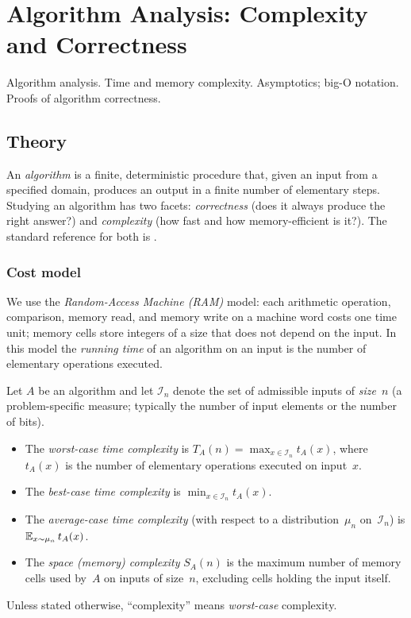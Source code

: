 
\section{Algorithm Analysis: Complexity and Correctness}
\label{sec:1.3.01-complexity-correctness}

\begin{ticket}
Algorithm analysis. Time and memory complexity. Asymptotics; big-O notation. Proofs of algorithm correctness.
\end{ticket}

\subsection*{Theory}

An \emph{algorithm} is a finite, deterministic procedure that, given an
input from a specified domain, produces an output in a finite number of
elementary steps. Studying an algorithm has two facets:
\emph{correctness} (does it always produce the right answer?) and
\emph{complexity} (how fast and how memory-efficient is it?). The
standard reference for both is \cite{CLRS2013}.

\subsubsection*{Cost model}

We use the \emph{Random-Access Machine (RAM)} model: each
arithmetic operation, comparison, memory read, and memory write on a
machine word costs one time unit; memory cells store integers of a
size that does not depend on the input. In this model the
\emph{running time} of an algorithm on an input is the number of
elementary operations executed.

\begin{definition}
\label{def:complexity}
Let $A$ be an algorithm and let $\mathcal{I}_n$ denote the set of
admissible inputs of \emph{size}~$n$ (a problem-specific measure;
typically the number of input elements or the number of bits).
\begin{itemize}
  \item The \emph{worst-case time complexity} is
        $T_A(n) = \max_{x \in \mathcal{I}_n} t_A(x)$,
        where $t_A(x)$ is the number of elementary operations executed
        on input~$x$.
  \item The \emph{best-case time complexity} is
        $\min_{x \in \mathcal{I}_n} t_A(x)$.
  \item The \emph{average-case time complexity} (with respect to a
        distribution~$\mu_n$ on~$\mathcal{I}_n$) is $\mathbb{E}_{x \sim \mu_n}\, t_A(x)$.
  \item The \emph{space (memory) complexity} $S_A(n)$ is the maximum
        number of memory cells used by~$A$ on inputs of size~$n$,
        excluding cells holding the input itself.
\end{itemize}
Unless stated otherwise, ``complexity'' means \emph{worst-case}
complexity.
\end{definition}

